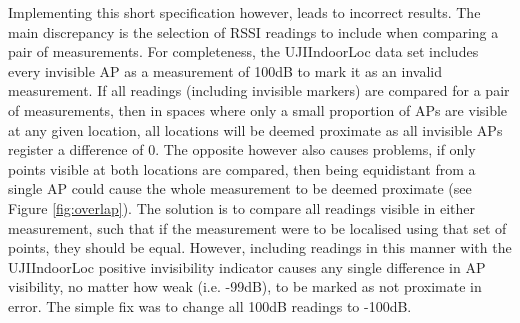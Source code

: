 \documentclass{UoYCSproject}
\begin{document}
            Implementing this short specification however, leads to incorrect results. The main discrepancy is the selection of RSSI readings to include when comparing a pair of measurements. For completeness, the UJIIndoorLoc data set includes every invisible AP as a measurement of 100dB to mark it as an invalid measurement. If all readings (including invisible markers) are compared for a pair of measurements, then in spaces where only a small proportion of APs are visible at any given location, all locations will be deemed proximate as all invisible APs register a difference of $0$. The opposite however also causes problems, if only points visible at both locations are compared, then being equidistant from a single AP could cause the whole measurement to be deemed proximate (see Figure \ref{fig:overlap}). The solution is to compare all readings visible in either measurement, such that if the measurement were to be localised using that set of points, they should be equal. However, including readings in this manner with the UJIIndoorLoc positive invisibility indicator causes any single difference in AP visibility, no matter how weak (i.e. -99dB), to be marked as not proximate in error. The simple fix was to change all 100dB readings to -100dB.
            
\end{document}
